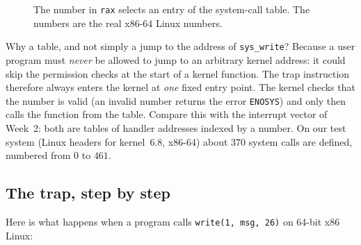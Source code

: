 \documentclass[11pt,a4paper]{article}
\newcommand{\cmd}[1]{\texttt{#1}}
\begin{document}
\begin{figure}[H]
\centering
{}
\caption{The number in \texttt{rax} selects an entry of the system-call table. The numbers are the real x86-64 Linux numbers.}
\end{figure}

Why a table, and not simply a jump to the address of \cmd{sys\_write}? Because a user program must \emph{never} be allowed to jump to an arbitrary kernel address: it could skip the permission checks at the start of a kernel function. The trap instruction therefore always enters the kernel at \emph{one} fixed entry point. The kernel checks that the number is valid (an invalid number returns the error \texttt{ENOSYS}) and only then calls the function from the table. Compare this with the interrupt vector of Week~2: both are tables of handler addresses indexed by a number. On our test system (Linux headers for kernel~6.8, x86-64) about $370$ system calls are defined, numbered from $0$ to $461$.

\subsection{The trap, step by step}

Here is what happens when a program calls \cmd{write(1, msg, 26)} on 64-bit x86 Linux:
\end{document}
